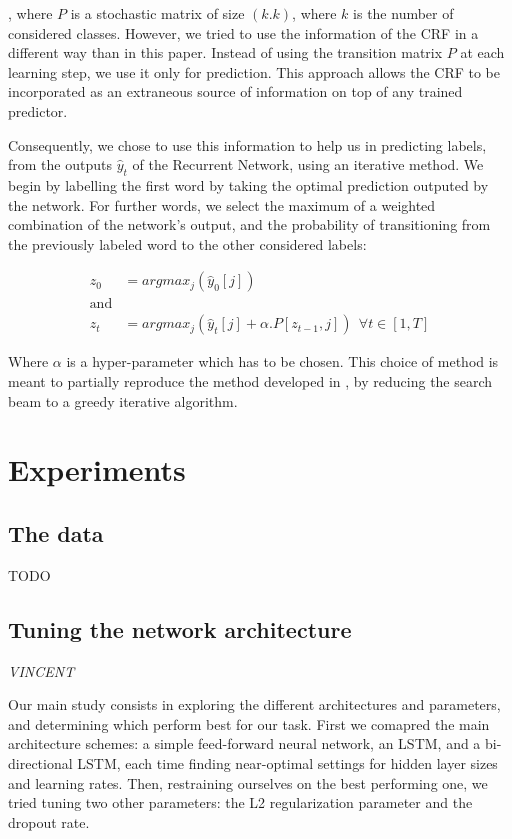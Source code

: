 \documentclass{article} %
\begin{document}
, where $P$ is a stochastic matrix of size $(k.k)$, where $k$ is the number of considered classes. However, we tried to use the information of the CRF in a different way than in this paper. Instead of using the transition matrix $P$ at each learning step, we use it only for prediction. This approach allows the CRF to be incorporated as an extraneous source of information on top of any trained predictor.

Consequently, we chose to use this information to help us in predicting labels, from the outputs $\hat{y}_t$ of the Recurrent Network, using an iterative method. We begin by labelling the first word by taking the optimal prediction outputed by the network. For further words, we select the maximum of a weighted combination of the network's output, and the probability of transitioning from the previously labeled word to the other considered labels:

\begin{align*}
z_0 &= argmax_j(\hat{y}_0[j])
\\
\text{and}&
\\
z_t &= argmax_j(\hat{y}_t[j] + \alpha.P[z_{t-1},  j]) \ \ \forall t \in [1, T]
\end{align*}


Where $\alpha$ is a hyper-parameter which has to be chosen. This
choice of method is meant to partially reproduce the method developed in \cite{lample2016neural}, by reducing the search beam to a greedy iterative algorithm.


\section{Experiments}

\subsection{The data}

TODO

\subsection{Tuning the network architecture}
\textit{VINCENT}

Our main study consists in exploring the different architectures and parameters, and determining which perform best for our task. First we comapred the main architecture schemes: a simple feed-forward neural network, an LSTM, and a bi-directional LSTM, each time finding near-optimal settings for hidden layer sizes and learning rates. Then, restraining ourselves on the best performing one, we tried tuning two other parameters: the L2 regularization parameter and the dropout rate.
\end{document}
